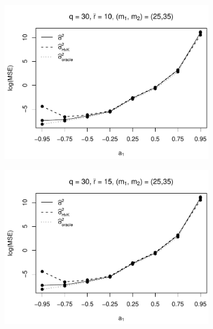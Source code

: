 \begin{figure}[p]
\begin{subfigure}[b]{0.45\textwidth}
\includegraphics[width=\textwidth]{Plots/Robustness/MSE_lrv_T=500_slope=1_(q,r,M1,M2)=(30,10,25,35).pdf}
\end{subfigure}
\hspace{0.25cm}
\begin{subfigure}[b]{0.45\textwidth}
\includegraphics[width=\textwidth]{Plots/Robustness/MSE_lrv_T=500_slope=1_(q,r,M1,M2)=(30,15,25,35).pdf}
\end{subfigure}


\end{figure}
